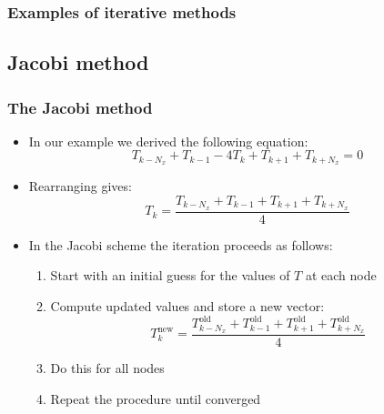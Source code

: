 \begin{frame}[fragile]
  \frametitle{Examples of iterative methods}
\end{frame}

\subsection*{Jacobi method}
\begin{frame}[fragile]
  \frametitle{The Jacobi method}
  \begin{itemize}
     \item In our example we derived the following equation:
    \[
     T_{k-N_x} + T_{k-1} - 4T_k + T_{k+1} + T_{k+N_x} = 0
    \]
    \item Rearranging gives:
    \[
      T_k = \frac{T_{k-N_x} + T_{k-1} + T_{k+1} + T_{k+N_x}}{4}
    \]\pause
    \item In the Jacobi scheme the iteration proceeds as follows:
    \begin{enumerate}
      \setlength{\itemindent}{1cm}
      \item Start with an initial guess for the values of $T$ at each node\pause
      \item Compute updated values and store a new vector:
        \[
          T_k^\text{new} = \frac{T_{k-N_x}^\text{old} + T_{k-1}^\text{old} + T_{k+1}^\text{old} + T_{k+N_x}^\text{old}}{4}
        \]\pause
      \item Do this for all nodes\pause
      \item Repeat the procedure until converged
    \end{enumerate}
  \end{itemize}
\end{frame}

